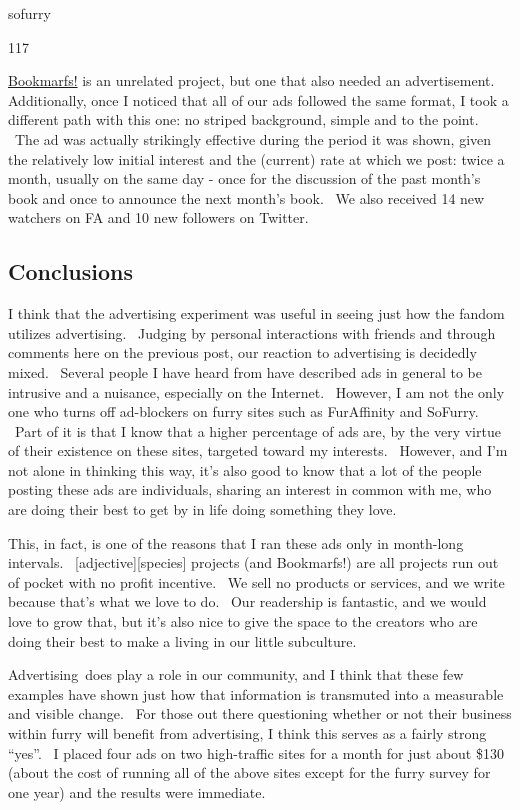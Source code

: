 sofurry

117

\href{http://bookmarfs.com}{Bookmarfs!} is an unrelated project, but one
that also needed an advertisement. Additionally, once I noticed that all
of our ads followed the same format, I took a different path with this
one: no striped background, simple and to the point. ~The ad was
actually strikingly effective during the period it was shown, given the
relatively low initial interest and the (current) rate at which we post:
twice a month, usually on the same day - once for the discussion of the
past month's book and once to announce the next month's book. ~We also
received 14 new watchers on FA and 10 new followers on Twitter.

\subsection{Conclusions}\label{conclusions}

I think that the advertising experiment was useful in seeing just how
the fandom utilizes advertising. ~Judging by personal interactions with
friends and through comments here on the previous post, our reaction to
advertising is decidedly mixed. ~Several people I have heard from have
described ads in general to be intrusive and a nuisance, especially on
the Internet. ~However, I am not the only one who turns off ad-blockers
on furry sites such as FurAffinity and SoFurry. ~Part of it is that I
know that a higher percentage of ads are, by the very virtue of their
existence on these sites, targeted toward my interests. ~However, and
I'm not alone in thinking this way, it's also good to know that a lot of
the people posting these ads are individuals, sharing an interest in
common with me, who are doing their best to get by in life doing
something they love.

This, in fact, is one of the reasons that I ran these ads only in
month-long intervals. ~{[}adjective{]}{[}species{]} projects (and
Bookmarfs!) are all projects run out of pocket with no profit incentive.
~We sell no products or services, and we write because that's what we
love to do. ~Our readership is fantastic, and we would love to grow
that, but it's also nice to give the space to the creators who are doing
their best to make a living in our little subculture.

Advertising~does play a role in our community, and I think that these
few examples have shown just how that information is transmuted into a
measurable and visible change. ~For those out there questioning whether
or not their business within furry will benefit from advertising, I
think this serves as a fairly strong ``yes''. ~I placed four ads on two
high-traffic sites for a month for just about \$130 (about the cost of
running all of the above sites except for the furry survey for one year)
and the results were immediate.

